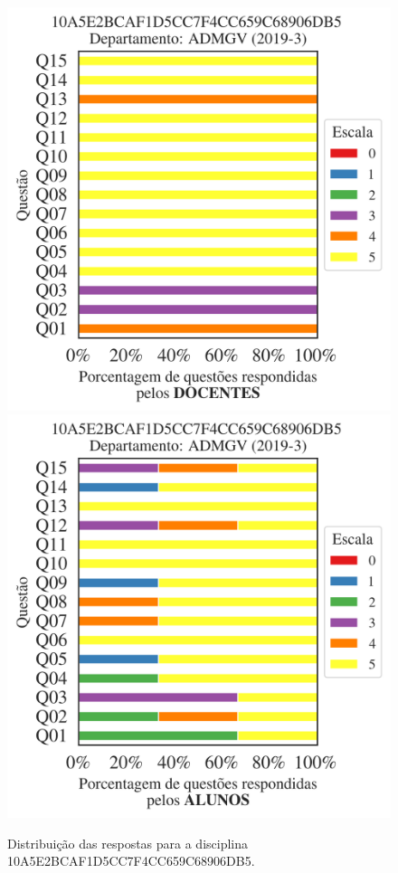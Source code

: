 \documentclass[a4paper,10pt]{article}
\begin{document}
\begin{figure}[h]
\centering
\includegraphics[width=0.485\linewidth]{analise_disciplina_departamento_ADMGV_10A5E2BCAF1D5CC7F4CC659C68906DB5_docentes.png}
\includegraphics[width=0.485\linewidth]{analise_disciplina_departamento_ADMGV_10A5E2BCAF1D5CC7F4CC659C68906DB5_alunos.png}
\caption{\label{fig:analise_geral_departamento}                Distribuição das respostas para a disciplina 10A5E2BCAF1D5CC7F4CC659C68906DB5. }
\end{figure}
\end{document}
